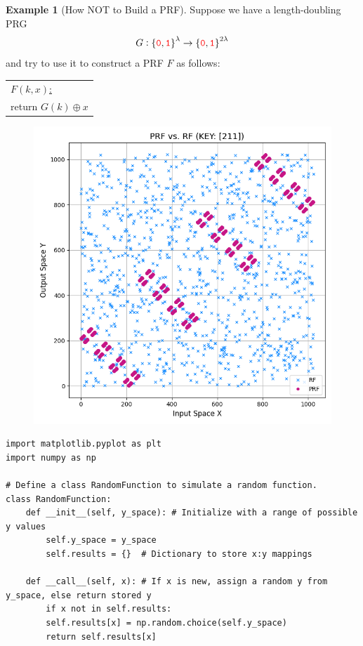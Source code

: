\documentclass[12pt,openany]{book}
\theoremstyle{definition}
\newtheorem{example}{Example}[chapter]
\newcommand{\zero}{\textcolor{red}{\texttt{0}}}
\newcommand{\one}{\textcolor{red}{\texttt{1}}}
\newcommand{\tab}{\hspace{12pt}}
\newcommand{\xor}{\oplus}
\newcommand{\binaryfield}{\set{\zero,\one}}
\begin{document}
\begin{example}[How NOT to Build a PRF]
	Suppose we have a length-doubling PRG \[
	G:\binaryfield^{\lambda}\to\binaryfield^{2\lambda}
	\] and try to use it to construct a PRF $F$ as follows:
	\begin{table}[h!]\centering
		\begin{tabular}{|l|}
			\hline
			\underline{$F(k,x)$:}\\
			\tab return $G(k)\xor x$\\
			\hline
		\end{tabular}
	\end{table}
	
	\begin{figure}[h!]\centering
		\includegraphics[scale=.5]{notprf.png}
	\end{figure}

\newpage
	\begin{lstlisting}[style=sage]
import matplotlib.pyplot as plt
import numpy as np

# Define a class RandomFunction to simulate a random function.
class RandomFunction:
	def __init__(self, y_space): # Initialize with a range of possible y values
		self.y_space = y_space
		self.results = {}  # Dictionary to store x:y mappings

	def __call__(self, x): # If x is new, assign a random y from y_space, else return stored y
		if x not in self.results:
		self.results[x] = np.random.choice(self.y_space)
		return self.results[x]


\end{lstlisting}
\end{example}
\end{document}

